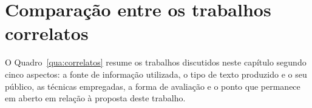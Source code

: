 
\section{Comparação entre os trabalhos correlatos}

O Quadro~\ref{qua:correlatos} resume os trabalhos discutidos neste capítulo
segundo cinco aspectos: a fonte de informação utilizada, o tipo de texto
produzido e o seu público, as técnicas empregadas, a forma de avaliação e
o ponto que permanece em aberto em relação à proposta deste trabalho.

